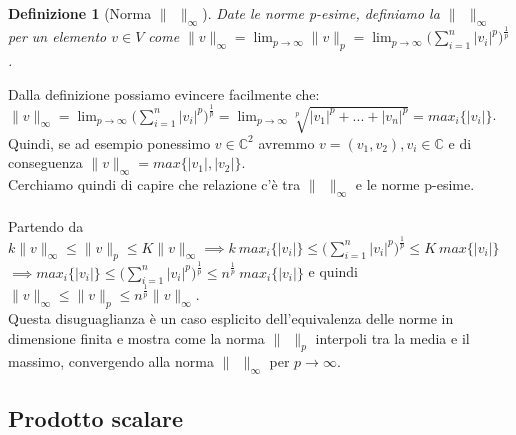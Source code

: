 \documentclass[a4paper,12pt]{report}
\newtheorem{definizione}{Definizione}[chapter]
\begin{document}
\newpage

\begin{definizione}[Norma $\| \ \ \|_{\infty}$]\label{def: 2.5}
    Date le norme p-esime, definiamo la $\| \ \ \|_{\infty}$ per un elemento $v \in V$ come $\|v\|_{\infty}=\displaystyle\lim_{p \to \infty}\|v\|_p=\lim_{p \to \infty}\bigg(\sum_{i=1}^n|v_i|^p\bigg)^{\frac{1}{p}}$.
\end{definizione}
\vspace{0.5cm}

Dalla definizione possiamo evincere facilmente che:
\\$\|v\|_{\infty}=\displaystyle\lim_{p \to \infty}\bigg(\sum_{i=1}^n|v_i|^p\bigg)^{\frac{1}{p}}
=\lim_{p \to \infty}\sqrt[p]{|v_1|^p+...+|v_n|^p}=max_i\{|v_i|\}$. Quindi, se ad esempio ponessimo $v \in \mathbb{C}^2$ avremmo $v=(v_1,v_2), v_i \in \mathbb{C}$ e di conseguenza $\|v\|_{\infty}=max\{|v_1|,|v_2|\}$. 
\\Cerchiamo quindi di capire che relazione c'è tra $\| \ \ \|_{\infty}$ e le norme p-esime. 
\\
\\ Partendo da $k\| v \|_{\infty} \leq\| v\|_p \leq K\| v \|_{\infty} \implies k \ max_i\{|v_i|\} \leq \bigg(\displaystyle\sum_{i =1}^n|v_i|^p\bigg)^{\frac{1}{p}}\leq K \ max\{|v_i|\} $
\\$\implies max_i\{|v_i|\} \leq \bigg( \displaystyle\sum_{i =1}^n|v_i|^p\bigg)^{\frac{1}{p}} \leq n^{\frac{1}{p}} \ max_i\{|v_i|\} $ e quindi $\|v\|_{\infty} \leq \|v\|_p \leq n^{\frac{1}{p}}\|v\|_{\infty}$.
\\ Questa disuguaglianza è un caso esplicito dell’equivalenza delle norme in dimensione finita e mostra come la norma $\| \ \ \|_p$ interpoli tra la media e il massimo, convergendo alla norma $\| \ \ \|_{\infty}$ per $p \to \infty$.

\subsection{Prodotto scalare}
\end{document}
